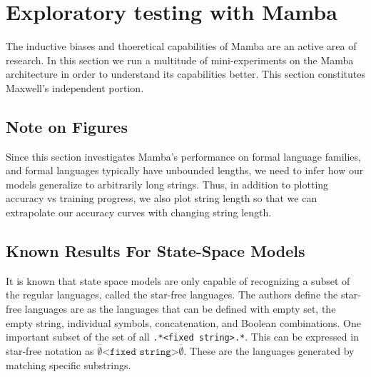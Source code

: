 \section{Exploratory testing with Mamba}
The inductive biases and thoeretical capabilities of Mamba are an active area of
research. In this section we run a multitude of mini-experiments on the Mamba
architecture in order to understand its capabilities better.
This section constitutes Maxwell's independent portion.

\subsection{Note on Figures}
Since this section investigates Mamba's performance on formal language families,
and formal languages typically have unbounded lengths, we need to infer how our
models generalize to arbitrarily long strings. Thus, in addition to plotting
accuracy vs training progress, we also plot string length so that we can
extrapolate our accuracy curves with changing string length.

\subsection{Known Results For State-Space Models}
It is known that state space models are only capable of recognizing a subset of
the regular languages\cite{ssmformal}, called the star-free languages.
The authors define the star-free languages are as the languages that can be
defined with empty set, the empty string, individual symbols, concatenation, and
Boolean combinations.
One important subset of the set of all \verb-.*<fixed string>.*-.
This can be expressed in star-free notation as
$\overline{\emptyset}\texttt{<fixed string>}\overline{\emptyset}$.
These are the languages generated by matching specific substrings.

